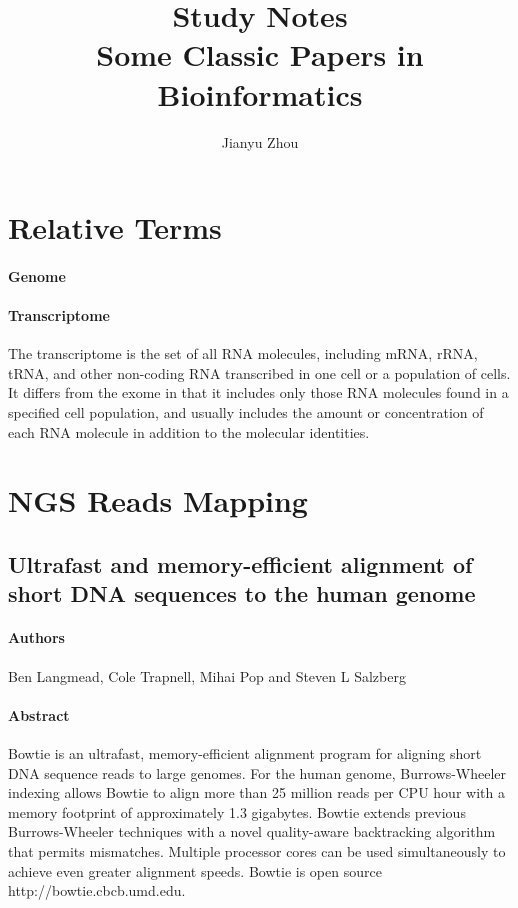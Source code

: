 \documentclass{article}
\title{\textbf{Study Notes} \\ Some Classic Papers in Bioinformatics}
\author{Jianyu Zhou}
\begin{document}
	\maketitle
	\tableofcontents
	\newpage
	\section{Relative Terms}
		\paragraph{Genome}
		\paragraph{Transcriptome} The transcriptome is the set of all RNA molecules, including mRNA, rRNA, tRNA, and other non-coding RNA transcribed in one cell or a population of cells. It differs from the exome in that it includes only those RNA molecules found in a specified cell population, and usually includes the amount or concentration of each RNA molecule in addition to the molecular identities.
	\section{NGS Reads Mapping}
		\subsection{Ultrafast and memory-efficient alignment of short DNA sequences to the human genome}
			\paragraph{Authors\\} Ben Langmead, Cole Trapnell, Mihai Pop and Steven L Salzberg
			\paragraph{Abstract\\} Bowtie is an ultrafast, memory-efficient alignment program for aligning short DNA sequence reads to large genomes. For the human genome, Burrows-Wheeler indexing allows Bowtie to align more than 25 million reads per CPU hour with a memory footprint of approximately 1.3 gigabytes. Bowtie extends previous Burrows-Wheeler techniques with a novel quality-aware backtracking algorithm that permits mismatches. Multiple processor cores can be used simultaneously to achieve even greater alignment speeds. Bowtie is open source http://bowtie.cbcb.umd.edu.
\end{document}
